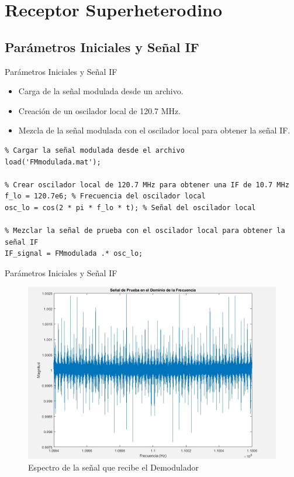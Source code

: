 \documentclass[mathserif,spanish]{beamer}
\begin{document}
\section{Receptor Superheterodino}

\subsection{Parámetros Iniciales y Señal IF}
\begin{frame}{Parámetros Iniciales y Señal IF}
    \begin{itemize}
        \item Carga de la señal modulada desde un archivo.
        \item Creación de un oscilador local de 120.7 MHz.
        \item Mezcla de la señal modulada con el oscilador local para obtener la señal IF.
    \end{itemize}
    \begin{tcolorbox}[colback=yellow!5!white, colframe=yellow!75!black, title=Parámetros Iniciales y Señal IF, fonttitle=\normalsize, fontupper=\normalsize]
\begin{lstlisting}
% Cargar la señal modulada desde el archivo
load('FMmodulada.mat');

% Crear oscilador local de 120.7 MHz para obtener una IF de 10.7 MHz
f_lo = 120.7e6; % Frecuencia del oscilador local
osc_lo = cos(2 * pi * f_lo * t); % Señal del oscilador local

% Mezclar la señal de prueba con el oscilador local para obtener la señal IF
IF_signal = FMmodulada .* osc_lo;
\end{lstlisting}
    \end{tcolorbox}
\end{frame}



\begin{frame}{Parámetros Iniciales y Señal IF}
 
    \begin{figure}[h]
        \centering
        \includegraphics[scale=0.25]{signal_test.png}
        \caption{Espectro de la señal que recibe el Demodulador}
    \end{figure}
    
\end{frame}
\end{document}
